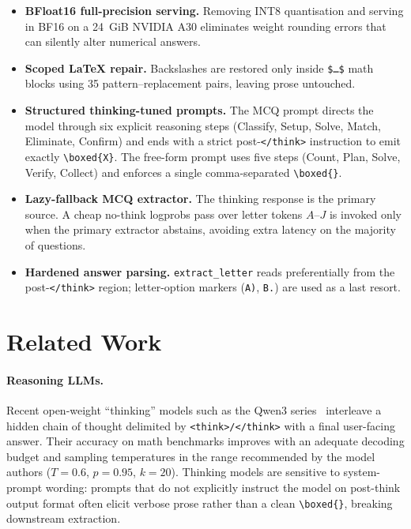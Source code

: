 \documentclass{article}
\begin{document}
\begin{itemize}
  \item \textbf{BFloat16 full-precision serving.} Removing INT8 quantisation
    and serving in BF16 on a 24~GiB NVIDIA A30 eliminates weight rounding
    errors that can silently alter numerical answers.

  \item \textbf{Scoped LaTeX repair.} Backslashes are restored only inside
    \texttt{\$\ldots\$} math blocks using 35 pattern--replacement pairs,
    leaving prose untouched.

  \item \textbf{Structured thinking-tuned prompts.} The MCQ prompt directs the
    model through six explicit reasoning steps (Classify, Setup, Solve, Match,
    Eliminate, Confirm) and ends with a strict post-\texttt{</think>}
    instruction to emit exactly \texttt{\textbackslash boxed\{X\}}.
    The free-form prompt uses five steps (Count, Plan, Solve, Verify, Collect)
    and enforces a single comma-separated \texttt{\textbackslash boxed\{\}}.

  \item \textbf{Lazy-fallback MCQ extractor.} The thinking response is the
    primary source.  A cheap no-think logprobs pass over letter tokens $A$--$J$
    is invoked only when the primary extractor abstains, avoiding extra latency
    on the majority of questions.

  \item \textbf{Hardened answer parsing.} \texttt{extract\_letter} reads
    preferentially from the post-\texttt{</think>} region; letter-option
    markers (\texttt{A)}, \texttt{B.}) are used as a last resort.
\end{itemize}


\section{Related Work}
\label{sec:relatedwork}

\paragraph{Reasoning LLMs.}
Recent open-weight ``thinking'' models such as the Qwen3
series~\citep{qwen3} interleave a hidden chain of thought delimited by
\texttt{<think>/</think>} with a final user-facing answer.
Their accuracy on math benchmarks improves with an adequate decoding budget
and sampling temperatures in the range recommended by the model authors
($T{=}0.6$, $p{=}0.95$, $k{=}20$).
Thinking models are sensitive to system-prompt wording: prompts that do
not explicitly instruct the model on post-think output format often elicit
verbose prose rather than a clean \texttt{\textbackslash boxed\{\}},
breaking downstream extraction.
\end{document}
